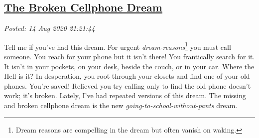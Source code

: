 %

\subsection*{\href{http://analyzethedatanotthedrivel.org/2020/08/14/the-broken-cellphone-dream/}{The Broken Cellphone Dream}}


\noindent\emph{Posted: 14 Aug 2020 21:21:44}
\vspace{6pt}

Tell me if you've had this dream. For urgent
\emph{dream-reasons}\footnote{Dream reasons are compelling
 in the dream but often vanish on waking.}  you
must call someone. You reach for your phone but it isn't there! You
frantically search for it. It isn't in your pockets, on your desk,
beside the couch, or in your car. Where the Hell is it? In desperation,
you root through your closets and find one of your old phones. You're
saved! Relieved you try calling only to find the old phone doesn't work;
it's broken. Lately, I've had repeated versions of this dream. The
missing and broken cellphone dream is the new
\emph{going-to-school-without-pants} dream.


%



%
